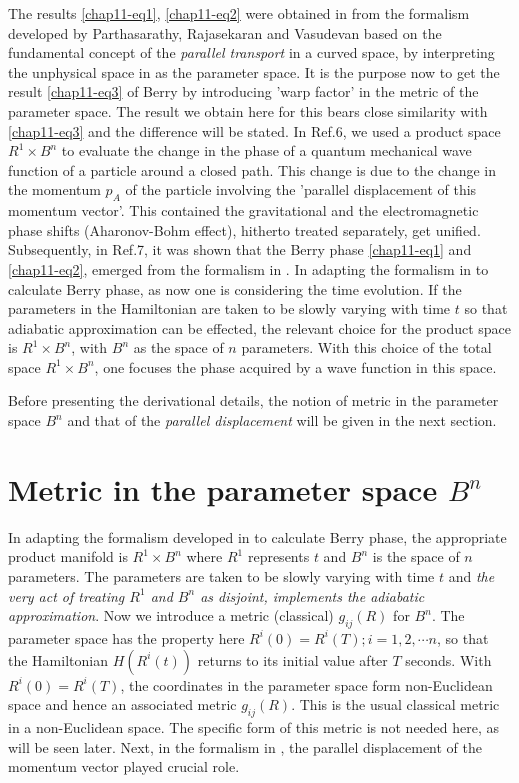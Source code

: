 The results  \eqref{chap11-eq1}, \eqref{chap11-eq2} were obtained in \cite{chap11-key7} from the formalism developed by Parthasarathy, Rajasekaran and  Vasudevan \cite{chap11-key6} based on the fundamental concept of the {\it{parallel transport}} in a curved space, by interpreting  the unphysical space in \cite{chap11-key6} as the parameter space. It is the purpose now to get the result \eqref{chap11-eq3} of Berry \cite{chap11-key5}  by introducing 'warp factor' in the metric of the parameter space. The result we obtain here for  this bears close similarity with \eqref{chap11-eq3} and the difference will be stated. In Ref.6, we used a product space $R^1 \times B^n$ to evaluate the change in the phase of a quantum mechanical wave function of a particle around a  closed path. This change is due to the change in the momentum $p_A$ of the particle involving the 'parallel  displacement of this momentum vector'. This contained the gravitational and the electromagnetic phase shifts  (Aharonov-Bohm effect), hitherto treated separately, get unified. Subsequently, in Ref.7, it was shown that the  Berry phase \eqref{chap11-eq1} and \eqref{chap11-eq2}, emerged from the formalism in \cite{chap11-key6}. In adapting the formalism in \cite{chap11-key6} to calculate Berry phase,  as now one is considering the time evolution. If  the parameters in the Hamiltonian are taken to be slowly varying with time $t$ so that adiabatic approximation  can be effected, the relevant choice for the product space is $R^1\times B^n$, with $B^n$ as the space of $n$  parameters. With this choice of the total space $R^1\times B^n$, one focuses the phase acquired by a wave function  in this space. 

Before presenting the derivational details, the notion of metric in the parameter space $B^n$ and that of the  {\textit{parallel displacement}} will be given in the next section. 

\section{Metric in the parameter space $B^n$}\label{chap11-sec2}

In adapting the formalism developed in \cite{chap11-key6} to calculate Berry phase, the appropriate product manifold is $R^1  \times B^n$ where $R^1$ represents $t$ and $B^n$ is the space of $n$ parameters. The parameters are taken to be  slowly varying with time $t$ and {\it{the very act of treating $R^1$ and $B^n$ as disjoint, implements the  adiabatic approximation}}. Now we introduce a metric (classical) $g_{ij}(R)$ for $B^n$. The parameter space has  the property here $R^i(0)=R^i(T); i=1,2,\cdots n$, so that the Hamiltonian $H(R^i(t))$ returns to its initial value  after $T$ seconds. With $R^i(0)=R^i(T)$, the coordinates in the parameter space form non-Euclidean space and hence  an associated metric $g_{ij}(R)$. This is the usual classical metric in a non-Euclidean space. The specific form  of this metric is not needed here, as will be seen later.  Next, in the formalism in \cite{chap11-key6}, the parallel displacement of the momentum vector played crucial role.  
 

